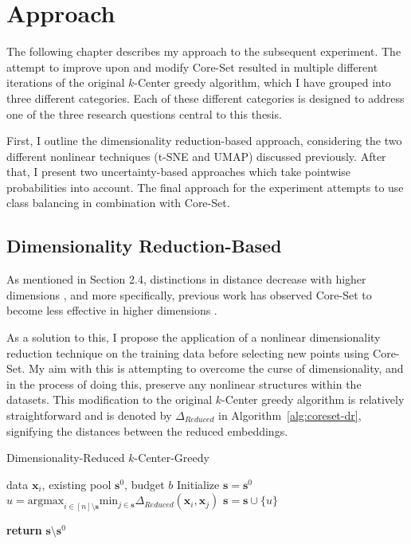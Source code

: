 \documentclass[english,bachelor,ul]{webisthesis} %
\begin{document}
\chapter{Approach}

The following chapter describes my approach to the subsequent experiment. The attempt to improve upon and modify Core-Set resulted in multiple different iterations of the original $k$-Center greedy algorithm, which I have grouped into three different categories. Each of these different categories is designed to address one of the three research questions central to this thesis. 

First, I outline the dimensionality reduction-based approach, considering the two different nonlinear techniques (t-SNE and UMAP) discussed previously. After that, I present two uncertainty-based approaches which take pointwise probabilities into account. The final approach for the experiment attempts to use class balancing in combination with Core-Set.

\section{Dimensionality Reduction-Based}

As mentioned in Section 2.4, distinctions in distance decrease with higher dimensions \citep{DBLP:conf/icdt/BeyerGRS99}, and more specifically, previous work has observed Core-Set to become less effective in higher dimensions \citep{DBLP:conf/iccv/SinhaED19}.

As a solution to this, I propose the application of a nonlinear dimensionality reduction technique on the training data before selecting new points using Core-Set. My aim with this is attempting to overcome the curse of dimensionality, and in the process of doing this, preserve any nonlinear structures within the datasets. This modification to the original $k$-Center greedy algorithm is relatively straightforward and is denoted by $ \Delta_{Reduced} $ in Algorithm~\ref{alg:coreset-dr}, signifying the distances between the reduced embeddings.

\begin{algorithm}[htpb]
\caption{Dimensionality-Reduced $k$-Center-Greedy}%
\label{alg:coreset-dr}
\begin{algorithmic}


\Require data $ \mathbf{x}_i $, existing pool $ \mathbf{s}^0 $, budget $ b $
\State Initialize $ \mathbf{s} = \mathbf{s}^0 $
\Repeat
\State $ u = \text{argmax}_{i \in [n] \setminus \mathbf{s}} \text{min}_{j \in \mathbf{s}} \Delta_{Reduced}(\mathbf{x}_i, \mathbf{x}_j) $
\State $ \mathbf{s} = \mathbf{s} \cup \{u\} $

\State \textbf{return} $\mathbf{s} \setminus \mathbf{s}^0 $
\end{algorithmic}
\end{algorithm}
\end{document}
